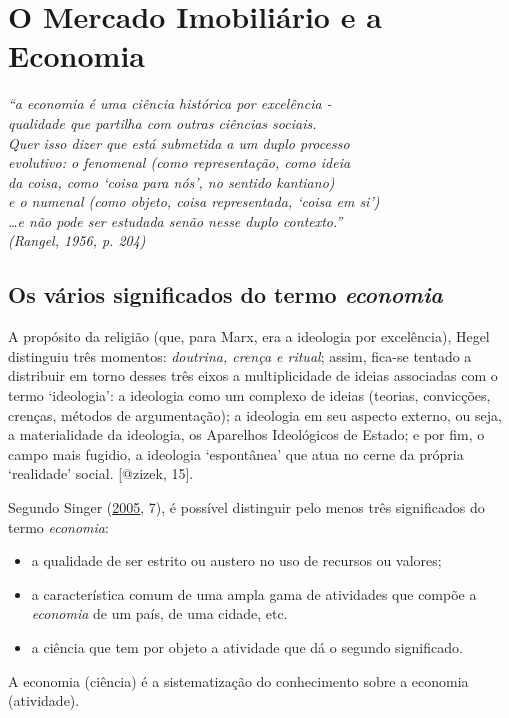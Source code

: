 \documentclass[
	12pt,				%
	oneside,			%
	a4paper,			%
	chapter=TITLE,		%
	section=TITLE,		%
	english,			%
	brazil				%
	]{abntex2}
\begin{document}
\hypertarget{economia}{%
\chapter{O Mercado Imobiliário e a Economia}\label{economia}}
\begin{epigrafe}
    \vspace*{\fill}
    \begin{flushright}
    \textit{``a economia é uma ciência histórica por excelência -\\
    qualidade que partilha com outras ciências sociais.\\
    Quer isso dizer que está submetida a um duplo processo\\
    evolutivo: o fenomenal (como representação, como ideia \\
    da coisa, como `coisa para nós', no sentido kantiano)\\
    e o numenal (como objeto, coisa representada, `coisa em si')\\
    \ldots e não pode ser estudada senão nesse duplo contexto.''\\
    (Rangel, 1956, p. 204)}
    \end{flushright}
\end{epigrafe}
\hypertarget{os-vuxe1rios-significados-do-termo}{%
\section{\texorpdfstring{Os vários significados do termo \emph{economia}}{Os vários significados do termo }}\label{os-vuxe1rios-significados-do-termo}}
\begin{citacao}
A propósito da religião (que, para Marx, era a ideologia por excelência), Hegel
distinguiu três momentos: \emph{doutrina, crença e ritual}; assim, fica-se
tentado a distribuir em torno desses três eixos a multiplicidade de ideias
associadas com o termo `ideologia': a ideologia como um complexo de ideias
(teorias, convicções, crenças, métodos de argumentação); a ideologia em seu
aspecto externo, ou seja, a materialidade da ideologia, os Aparelhos Ideológicos
de Estado; e por fim, o campo mais fugidio, a ideologia `espontânea' que atua
no cerne da própria `realidade' social.
\cite[p.~15]{zizek} [@zizek, 15].
\end{citacao}
Segundo Singer (\protect\hyperlink{ref-singer}{2005}, 7), é possível distinguir pelo menos três significados
do termo \emph{economia}:
\begin{itemize}
\tightlist
\item
  a qualidade de ser estrito ou austero no uso de recursos ou valores;
\item
  a característica comum de uma ampla gama de atividades que compõe a \emph{economia}
  de um país, de uma cidade, etc.
\item
  a ciência que tem por objeto a atividade que dá o segundo significado.
\end{itemize}
A economia (ciência) é a sistematização do conhecimento sobre a economia
(atividade).
\end{document}
